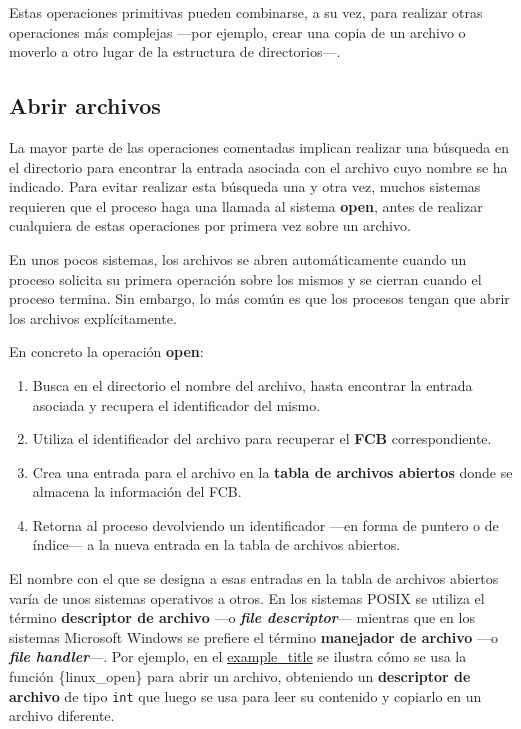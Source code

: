 Estas operaciones primitivas pueden combinarse, a su vez, para realizar
otras operaciones más complejas ---por ejemplo, crear una copia de un
archivo o moverlo a otro lugar de la estructura de directorios---.

\subsection{Abrir archivos}\label{_abrir_archivos}

La mayor parte de las operaciones comentadas implican realizar una
búsqueda en el directorio para encontrar la entrada asociada con el
archivo cuyo nombre se ha indicado. Para evitar realizar esta búsqueda
una y otra vez, muchos sistemas requieren que el proceso haga una
llamada al sistema \textbf{open}, antes de realizar cualquiera de estas
operaciones por primera vez sobre un archivo.

En unos pocos sistemas, los archivos se abren automáticamente cuando un
proceso solicita su primera operación sobre los mismos y se cierran
cuando el proceso termina. Sin embargo, lo más común es que los procesos
tengan que abrir los archivos explícitamente.

En concreto la operación \textbf{open}:

\begin{enumerate}
\def\labelenumi{\arabic{enumi}.}
\item
  Busca en el directorio el nombre del archivo, hasta encontrar la
  entrada asociada y recupera el identificador del mismo.
\item
  Utiliza el identificador del archivo para recuperar el \textbf{FCB}
  correspondiente.
\item
  Crea una entrada para el archivo en la \textbf{tabla de archivos
  abiertos} donde se almacena la información del FCB.
\item
  Retorna al proceso devolviendo un identificador ---en forma de puntero
  o de índice--- a la nueva entrada en la tabla de archivos abiertos.
\end{enumerate}

El nombre con el que se designa a esas entradas en la tabla de archivos
abiertos varía de unos sistemas operativos a otros. En los sistemas
POSIX se utiliza el término \textbf{{}descriptor de archivo} ---o
\textbf{\emph{file descriptor}}--- mientras que en los sistemas
Microsoft Windows se prefiere el término \textbf{manejador de archivo}{}
---o \textbf{\emph{file handler}}---. Por ejemplo, en el
\hyperref[ejemplo-archivos]{example\_title} se ilustra cómo se usa la
función \{linux\_open\} para abrir un archivo, obteniendo un
\textbf{descriptor de archivo} de tipo \texttt{int} que luego se usa
para leer su contenido y copiarlo en un archivo diferente.

